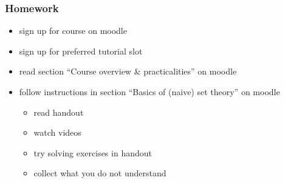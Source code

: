 \documentclass[fleqn,10pt,serif,xcolor=svgnames,xcolor=table,aspectratio=169]{beamer}
\begin{document}
\begin{frame}
  \frametitle{Homework}

  \begin{itemize}
    \item sign up for course on moodle
    \item sign up for preferred tutorial slot
    \item read section ``Course overview \& practicalities'' on moodle
    \item follow instructions in section ``Basics of (naive) set theory'' on moodle
    \begin{itemize}
      \item read handout
      \item watch videos
      \item try solving exercises in handout
      \item collect what you do not understand
    \end{itemize}
  \end{itemize}

\end{frame}
\end{document}
